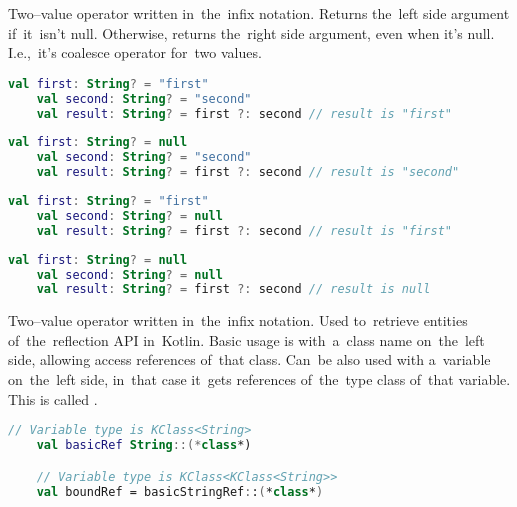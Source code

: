 Two--value operator written in~the~infix notation.
Returns the~left side argument if~it~isn't null.
Otherwise, returns the~right side argument, even when it's null.
I.e.,~it's coalesce operator for~two values.

\begin{lstlisting}[language=Kotlin]
    val first: String? = "first"
    val second: String? = "second"
    val result: String? = first ?: second // result is "first"
\end{lstlisting}

\begin{lstlisting}[language=Kotlin]
    val first: String? = null
    val second: String? = "second"
    val result: String? = first ?: second // result is "second"
\end{lstlisting}

\begin{lstlisting}[language=Kotlin]
    val first: String? = "first"
    val second: String? = null
    val result: String? = first ?: second // result is "first"
\end{lstlisting}

\begin{lstlisting}[language=Kotlin]
    val first: String? = null
    val second: String? = null
    val result: String? = first ?: second // result is null
\end{lstlisting}
\newpage

\label{kotlinreflection}
Two--value operator written in~the~infix notation.
Used to~retrieve entities of~the~reflection API in~Kotlin.
Basic usage is with~a~class name on~the~left side, allowing access references of~that class.
Can~be also used with a~variable on~the~left side, in~that case it~gets references of~the~type class of~that variable.
This is called .

\begin{lstlisting}[language=Kotlin]
    // Variable type is KClass<String>
    val basicRef String::(*class*)

    // Variable type is KClass<KClass<String>>
    val boundRef = basicStringRef::(*class*)
\end{lstlisting}
\newline

